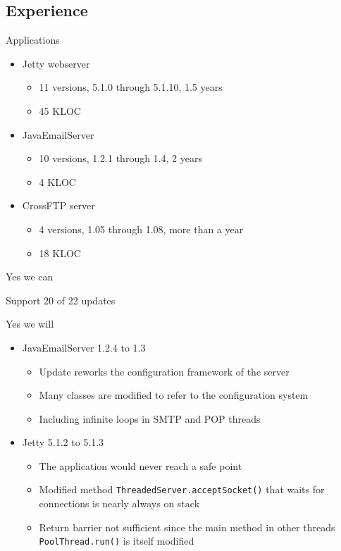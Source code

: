 
\subsection{Experience}
\ShowTOC

\newcommand{\HighlightRow}{\rowcolor{structure.fg!30}}

\begin{frame}{Applications}%
\begin{itemize}
\item Jetty webserver
  \begin{itemize}
  \item 11 versions, 5.1.0 through 5.1.10, 1.5 years
  \item 45 KLOC
  \end{itemize}
\item JavaEmailServer
  \begin{itemize}
  \item 10 versions, 1.2.1 through 1.4, 2 years
  \item 4 KLOC
  \end{itemize}
\item CrossFTP server
  \begin{itemize}
  \item 4 versions, 1.05 through 1.08, more than a year
  \item 18 KLOC
  \end{itemize}
\end{itemize}
\end{frame}

\begin{frame}{Yes we can}%
\begin{center}
{\Huge Support 20 of 22 updates}
\end{center}
\end{frame}

\begin{frame}{Yes we will}%
\begin{itemize}
\item JavaEmailServer 1.2.4 to 1.3
  \begin{itemize}
  \item Update reworks the configuration framework of the server
  \item Many classes are modified to refer to the configuration system
  \item Including infinite loops in SMTP and POP threads
  \end{itemize}
\item Jetty 5.1.2 to 5.1.3
  \begin{itemize}
  \item The application would never reach a safe point
  \item Modified method {\tt ThreadedServer.acceptSocket()} that waits for
        connections is nearly always on stack
  \item Return barrier not sufficient since the main method in other
        threads {\tt PoolThread.run()} is itself modified
  \end{itemize}
\end{itemize}
\end{frame}

